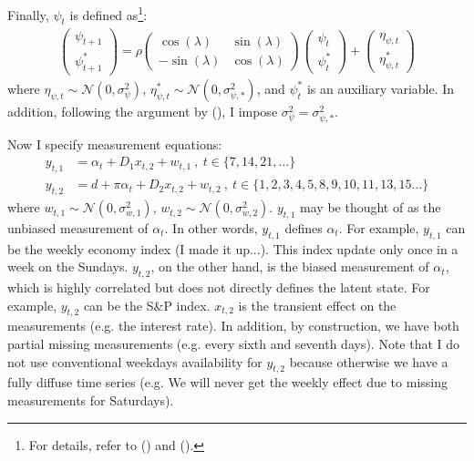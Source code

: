 \documentclass[10pt]{article}
\numberwithin{equation}{section}
\begin{document}
Finally, $\psi_t$ is defined as\footnote{For details, refer to (\cite{harvey_1985}) and (\cite{harvey2007trends}).}:
\begin{align}
    \begin{pmatrix}
        \psi_{t+1} \\
        \psi_{t+1}^{*}
    \end{pmatrix}
    =\rho\begin{pmatrix}
        \cos(\lambda) & \sin(\lambda) \\
        -\sin(\lambda) & \cos(\lambda)
    \end{pmatrix}
    \begin{pmatrix}
        \psi_{t} \\
        \psi_{t}^{*}
    \end{pmatrix}
    +\begin{pmatrix}
        \eta_{\psi,t} \\
        \eta_{\psi,t}^{*}
    \end{pmatrix} \label{eq:cycle}
\end{align}
where $\eta_{\psi,t}\sim\mathcal{N}(0,\sigma_{\psi}^2)$, $\eta_{\psi,t}^{*}\sim\mathcal{N}(0,\sigma_{\psi,*}^2)$, and $\psi_{t}^{*}$ is an auxiliary variable. In addition, following the argument by (\cite{harvey_1985}), I impose $\sigma_{\psi}^2=\sigma_{\psi,*}^2$.

Now I specify measurement equations: 
\begin{align}
    y_{t,1} &= \alpha_t+D_1x_{t,2}+w_{t,1} \ , \ t\in\{7,14,21,...\} \\
    y_{t,2} &= d + \pi\alpha_t+D_2x_{t,2}+w_{t,2}\ , \ t\in\{1,2,3,4,5,8,9,10,11,13,15...\} \label{eq:y2}
\end{align}
where $w_{t,1}\sim\mathcal{N}(0,\sigma_{w,1}^2)$, $w_{t,2}\sim\mathcal{N}(0,\sigma_{w,2}^2)$. $y_{t,1}$ may be thought of as the unbiased measurement of $\alpha_t$. In other words, $y_{t,1}$ defines $\alpha_t$. For example, $y_{t,1}$ can be the weekly economy index (I made it up...). This index update only once in a week on the Sundays. $y_{t,2}$, on the other hand, is the biased measurement of $\alpha_t$, which is highly correlated but does not directly defines the latent state. For example, $y_{t,2}$ can be the S\&P index. $x_{t,2}$ is the transient effect on the measurements (e.g. the interest rate). In addition, by construction, we have both partial missing measurements (e.g. every sixth and seventh days). Note that I do not use conventional weekdays availability for $y_{t,2}$ because otherwise we have a fully diffuse time series (e.g. We will never get the weekly effect due to missing measurements for Saturdays).
\end{document}
